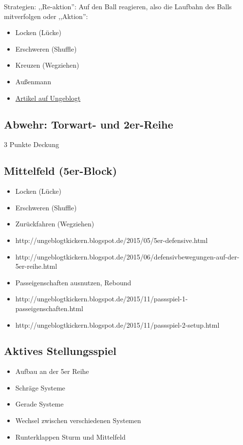 Strategien:
,,Re-aktion'': Auf den Ball reagieren, also die Laufbahn des Balls mitverfolgen oder ,,Aktion'':
\begin{itemize}
\item Locken (Lücke)
\item Erschweren (Shuffle)
\item Kreuzen (Wegziehen)
\item Außenmann 
\item \href{http://ungeblogtkickern.blogspot.de/2015/06/defensivbewegungen-im-verteidigerbereich.html}{Artikel auf Ungeblogt}
\end{itemize}


\subsection{Abwehr: Torwart- und 2er-Reihe}
\label{taktik:defensive:halten}

3 Punkte Deckung


\subsection{Mittelfeld (5er-Block)}
\label{taktik:defensive:5erblock}

\begin{itemize}
\item Locken (Lücke)
\item Erschweren (Shuffle)
\item Zurückfahren (Wegziehen)
\item http://ungeblogtkickern.blogspot.de/2015/05/5er-defensive.html
\item http://ungeblogtkickern.blogspot.de/2015/06/defensivbewegungen-auf-der-5er-reihe.html
\item Passeigenschaften ausnutzen, Rebound
\item http://ungeblogtkickern.blogspot.de/2015/11/passspiel-1-passeigenschaften.html
\item http://ungeblogtkickern.blogspot.de/2015/11/passspiel-2-setup.html
\end{itemize}  



\subsection{Aktives Stellungsspiel}
\label{taktik:defensive:aktivesstellungsspiel}

\begin{itemize}
\item Aufbau an der 5er Reihe
\item Schräge Systeme
\item Gerade Systeme
\item Wechsel zwischen verschiedenen Systemen
\item Runterklappen Sturm und Mittelfeld
\end{itemize}
